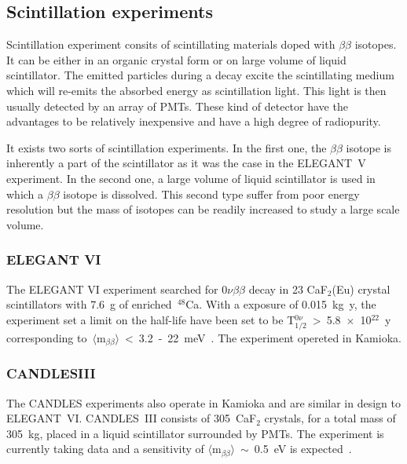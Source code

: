 \documentclass[main.tex]{subfiles}
\begin{document}
\subsection{Scintillation experiments}


\NI Scintillation experiment consits of scintillating materials doped with $\beta\beta$ isotopes. It can be either in an organic crystal form or on large volume of liquid scintillator. The emitted particles during a decay excite the scintillating medium which will re-emits the absorbed energy as scintillation light. This light is then usually detected by an array of PMTs. These kind of detector have the advantages to be relatively inexpensive and have a high degree of radiopurity. 


\bigskip


\NI It exists two sorts of scintillation experiments. In the first one, the $\beta\beta$ isotope is inherently a part of the scintillator as it was the case in the ELEGANT~V experiment. In the second one, a large volume of liquid scintillator is used in which a $\beta\beta$ isotope is dissolved. This second type suffer from poor energy resolution but the mass of isotopes can be readily increased to study a large scale volume.



\subsubsection{ELEGANT VI}


\NI The ELEGANT VI experiment searched for 0$\nu\beta\beta$ decay in 23 CaF$_\text{2}$(Eu) crystal scintillators with 7.6~g of enriched~$^{\text{48}}$Ca. With a exposure of 0.015~kg~y, the experiment set a limit on the half-life have been set to be T$_{\text{1/2}}^{0\nu}$~>~5.8~$\times$~10$^{\text{22}}$~y corresponding to~$\langle \text{m}_{\beta\beta} \rangle$~<~3.2~-~22~meV~\cite{ELEGANTVI}. The experiment opereted in Kamioka. \\


\subsubsection{CANDLESIII}


\NI The CANDLES experiments also operate in Kamioka and are similar in design to ELEGANT~VI. CANDLES~III consists of 305~CaF$_\text{2}$ crystals, for a total mass of 305~kg, placed in a liquid scintillator surrounded by PMTs. The experiment is currently taking data and a sensitivity of $\langle \text{m}_{\beta\beta} \rangle$~$\sim$~0.5~eV is expected~\cite{CANDLESIII}.
\end{document}
